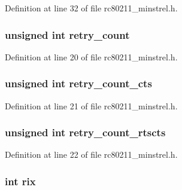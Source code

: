 Definition at line 32 of file rc80211\-\_\-minstrel.\-h.

\hypertarget{structminstrel__rate_aa01b3f9d6a9f63eb01422e4783c64f09}{
\subsubsection[{retry\-\_\-count}]{\setlength{\rightskip}{0pt plus 5cm}unsigned int retry\-\_\-count}}\label{structminstrel__rate_aa01b3f9d6a9f63eb01422e4783c64f09}


Definition at line 20 of file rc80211\-\_\-minstrel.\-h.

\hypertarget{structminstrel__rate_aff59bd4c5c6bc9d1639a4dc3bcebb2aa}{
\subsubsection[{retry\-\_\-count\-\_\-cts}]{\setlength{\rightskip}{0pt plus 5cm}unsigned int retry\-\_\-count\-\_\-cts}}\label{structminstrel__rate_aff59bd4c5c6bc9d1639a4dc3bcebb2aa}


Definition at line 21 of file rc80211\-\_\-minstrel.\-h.

\hypertarget{structminstrel__rate_ade58922c4f5867f4871e88d7d53c92fe}{
\subsubsection[{retry\-\_\-count\-\_\-rtscts}]{\setlength{\rightskip}{0pt plus 5cm}unsigned int retry\-\_\-count\-\_\-rtscts}}\label{structminstrel__rate_ade58922c4f5867f4871e88d7d53c92fe}


Definition at line 22 of file rc80211\-\_\-minstrel.\-h.

\hypertarget{structminstrel__rate_a803467ed3226692c9a6ed93a7a9725ce}{
\subsubsection[{rix}]{\setlength{\rightskip}{0pt plus 5cm}int rix}}\label{structminstrel__rate_a803467ed3226692c9a6ed93a7a9725ce}


